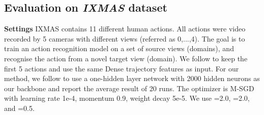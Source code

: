 \documentclass[10pt,twocolumn,letterpaper]{article}
\newcommand{\keypoint}[1]{\vspace{0.1cm}\noindent\textbf{#1}\quad}
\begin{document}
\begin{table*}[t]
\centering
{}
\vspace{-0.3cm}
\caption{\small Cross-dataset object recognition results (accuracy. \%) on VLCS benchmark. Best in bold.}
\label{tab:vlcs}
    \vspace{-0.3cm}
\end{table*}


\subsection{Evaluation on \textbf{\textit{IXMAS}} dataset}
\keypoint{Settings} IXMAS contains 11 different human actions. All actions were video recorded by 5 cameras with different views (referred as 0,...,4). The goal is to train an action recognition model on a set of source views (domains), and recognise the action from a novel target view (domain).
We follow \cite{Li2018mmdaae} to keep the first 5 actions and use the same Dense trajectory features as  input. For our method, we follow \cite{Li2018mmdaae} to use a one-hidden layer network with 2000 hidden neurons as our backbone and report the average result of 20 runs. The optimizer is M-SGD with learning rate 1e-4, momentum 0.9, weight decay 5e-5. We use =2.0, =2.0, and =0.5.
\end{document}
